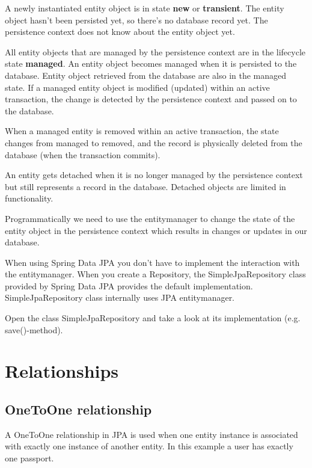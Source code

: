 A newly instantiated entity object is in state \textbf{new} or \textbf{transient}. The entity object hasn't been persisted yet, so there's no database record yet. The persistence context does not know about the entity object yet. 

All entity objects that are managed by the persistence context are in the lifecycle state \textbf{managed}. An entity object becomes managed when it is persisted to the database. Entity object retrieved from the database are also in the managed state.
If a managed entity object is modified (updated) within an active transaction, the change is detected by the persistence context and passed on to the database.

When a managed entity is removed within an active transaction, the state changes from managed to removed, and the record is physically deleted from the database (when the transaction commits).

An entity gets detached when it is no longer managed by the persistence context but still represents a record in the database.
Detached objects are limited in functionality.

 
Programmatically we need to use the entitymanager to change the state of the entity object in the persistence context which results in changes or updates in our database. 

When using Spring Data JPA you don't have to implement the interaction with the entitymanager. When you create a Repository, the SimpleJpaRepository class provided by Spring Data JPA provides the default implementation. SimpleJpaRepository class internally uses JPA entitymanager.

\begin{oefening}
Open the class SimpleJpaRepository and take a look at its implementation (e.g. save()-method).
\end{oefening}


\section{Relationships}

\subsection{OneToOne relationship}

A OneToOne relationship in JPA is used when one entity instance is associated with exactly one instance of another entity.  In this example a user has exactly one passport.

